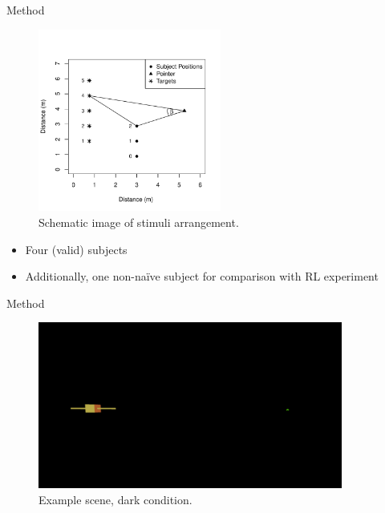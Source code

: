 \documentclass{beamer}
\begin{document}
\begin{frame}{Method}
    \begin{minipage}{6cm}
        \begin{figure}
            \centering
            \includegraphics[width = 6cm]{Images/schematicAufbau.pdf}
            \caption{Schematic image of stimuli arrangement.}
            \label{schematicAufbau}
        \end{figure}
    \end{minipage}
    \begin{minipage}{5cm}
        \begin{itemize}
            \item Four (valid) subjects
            \item Additionally, one non-na\"{i}ve subject for comparison with RL experiment
        \end{itemize}
    \end{minipage}
\end{frame}

\begin{frame}{Method}
    \begin{minipage}{10cm}
        \begin{figure}
            \centering
            \includegraphics[width = 10cm]{Images/SzeneDunkelBeispiel.png}
            \caption{Example scene, dark condition.}
            \label{ExSzeneDark}
        \end{figure}
    \end{minipage}
\end{frame}
\end{document}
